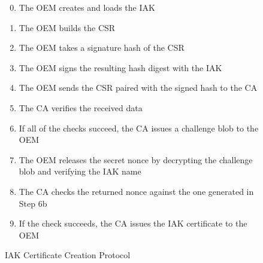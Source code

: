 \documentclass[runningheads]{llncs}
\begin{document}
\begin{figure}[hbtp]
\begin{enumerate}[itemsep=0pt,parsep=0pt,partopsep=0pt]
  \setcounter{enumi}{-1}
  \item The OEM creates and loads the IAK
  \item The OEM builds the CSR%
  \item The OEM takes a signature hash of the CSR
  \item The OEM signs the resulting hash digest with the IAK
  \item The OEM sends the CSR paired with the signed hash to the CA
  \item The CA verifies the received data%
  \item If all of the checks succeed, the CA issues a challenge blob to the OEM%
  \item The OEM releases the secret nonce by decrypting the challenge
    blob and verifying the IAK name
  \item The CA checks the returned nonce against the one generated in Step 6b
  \item If the check succeeds, the CA issues the IAK certificate to the OEM
  \end{enumerate}
  \caption{IAK Certificate Creation Protocol}
  \label{fig:iak-creation}
\end{figure}
\end{document}
